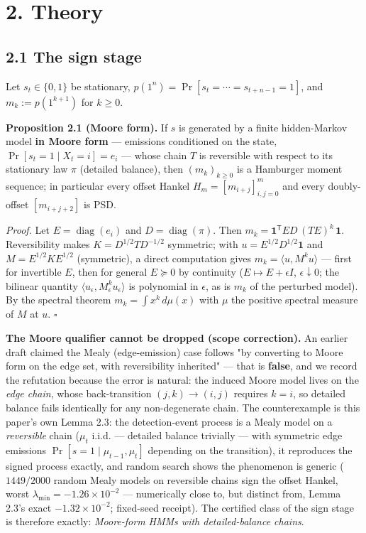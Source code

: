 \documentclass[11pt]{article}
\begin{document}
\section*{2. Theory}
\subsection*{2.1 The sign stage}
Let $s_t \in \{0,1\}$ be stationary, $p(1^n) = \Pr[s_t = \cdots = s_{t+n-1} = 1]$, and $m_k := p(1^{k+1})$ for $k \ge 0$.

\textbf{Proposition 2.1 (Moore form).}  If $s$ is generated by a finite hidden-Markov model \textbf{in Moore form} — emissions conditioned on the state, $\Pr[s_t = 1 \mid X_t = i] = e_i$ — whose chain $T$ is reversible with respect to its stationary law $\pi$ (detailed balance), then $(m_k)_{k\ge 0}$ is a Hamburger moment sequence; in particular every offset Hankel $H_m = [m_{i+j}]_{i,j=0}^m$ and every doubly-offset $[m_{i+j+2}]$ is PSD.

\emph{Proof.}  Let $E = \operatorname{diag}(e_i)$ and $D = \operatorname{diag}(\pi)$.  Then $m_k = \mathbf 1^{\mathsf T} E D\,(TE)^k\,\mathbf 1$. Reversibility makes $K = D^{1/2} T D^{-1/2}$ symmetric; with $u = E^{1/2} D^{1/2}\mathbf 1$ and $M = E^{1/2} K E^{1/2}$ (symmetric), a direct computation gives $m_k = \langle u, M^k u\rangle$ — first for invertible $E$, then for general $E \succeq 0$ by continuity ($E \mapsto E + \epsilon I$, $\epsilon \downarrow 0$; the bilinear quantity $\langle u_\epsilon, M_\epsilon^k u_\epsilon\rangle$ is polynomial in $\epsilon$, as is $m_k$ of the perturbed model).  By the spectral theorem $m_k = \int x^k\, d\mu(x)$ with $\mu$ the positive spectral measure of $M$ at $u$.  $\square$

\textbf{The Moore qualifier cannot be dropped (scope correction).}  An earlier draft claimed the Mealy (edge-emission) case follows "by converting to Moore form on the edge set, with reversibility inherited" — that is \textbf{false}, and we record the refutation because the error is natural: the induced Moore model lives on the \emph{edge chain}, whose back-transition $(j,k) \to (i,j)$ requires $k = i$, so detailed balance fails identically for any non-degenerate chain.  The counterexample is this paper's own Lemma 2.3: the detection-event process is a Mealy model on a \emph{reversible} chain ($\mu_t$ i.i.d. — detailed balance trivially — with symmetric edge emissions $\Pr[s = 1 \mid \mu_{t-1}, \mu_t]$ depending on the transition), it reproduces the signed process exactly, and random search shows the phenomenon is generic ($1449/2000$ random Mealy models on reversible chains sign the offset Hankel, worst $\lambda_{\min} = -1.26\times 10^{-2}$ — numerically close to, but distinct from, Lemma 2.3's exact $-1.32\times 10^{-2}$; fixed-seed receipt).  The certified class of the sign stage is therefore exactly: \emph{Moore-form HMMs with detailed-balance chains}.
\end{document}

